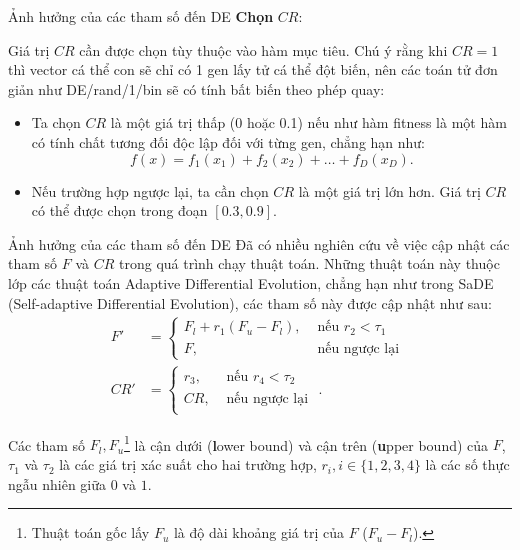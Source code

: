 \begin{frame}{Ảnh hưởng của các tham số đến DE}
\textbf{Chọn} \( CR \):

  Giá trị \( CR \) cần được chọn tùy thuộc vào hàm mục tiêu. Chú ý rằng khi \(
  CR = 1 \) thì vector cá thể con sẽ chỉ có 1 gen lấy tử cá thể đột biến, nên
  các toán tử đơn giản như DE/rand/1/bin sẽ có tính bất biến theo phép quay:

  \begin{itemize}
  \item Ta chọn \( CR \) là một giá trị thấp (0 hoặc 0.1) nếu như hàm fitness là
    một hàm có tính chất tương đối độc lập đối với từng gen, chẳng hạn như:
    \[
      f(x) = f_{1}(x_{1}) + f_{2}(x_{2}) + \ldots +f_{D}(x_{D})
    .\] 
  \item Nếu trường hợp ngược lại, ta cần chọn \( CR \) là một giá trị lớn hơn.
    Giá trị \( CR \) có thể được chọn trong đoạn \( [0.3, 0.9] \).
  \end{itemize}
\end{frame}

\begin{frame}{Ảnh hưởng của các tham số đến DE}
  Đã có nhiều nghiên cứu về việc cập nhật các tham số \( F \) và \( CR \) trong
  quá trình chạy thuật toán. Những thuật toán này thuộc lớp các thuật toán Adaptive
  Differential Evolution, chẳng hạn như trong SaDE (Self-adaptive Differential
  Evolution), các tham số này được cập nhật như sau:
  \begin{align*}
    F' &= \begin{cases}
      F_{l} + r_{1}(F_{u} - F_{l}), &\text{ nếu } r_{2} < \tau_{1}\\
      F, &\text{ nếu ngược lại }
    \end{cases}\\
      CR' &= \begin{cases}
      r_{3}, &\text{ nếu } r_{4}  < \tau_{2}\\
      CR, &\text{ nếu ngược lại }\\
    \end{cases}
  .\end{align*}

  Các tham số \( F_{l}, F_{u} \)\footnote{Thuật toán gốc lấy \( F_{u} \) là độ
  dài khoảng giá trị của \( F \) (\( F_{u} - F_{l} \)).} là cận dưới
  (\textbf{l}ower bound) và cận trên (\textbf{u}pper bound) của \( F \), \(
  \tau_{1} \) và \( \tau_{2} \) là các
  giá trị xác suất cho hai trường hợp, \( r_{i}, i\in \{1,2 ,3,4\}   \) là các
  số thực ngẫu nhiên giữa \( 0 \) và \( 1 \).
\end{frame}

